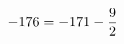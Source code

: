 \documentclass[preview]{standalone}
\begin{document}
\begin{align*}
\special{dvisvgm:raw <g id='unique000'>}-176 = -171 - \frac{9}{2}\special{dvisvgm:raw </g>}
\end{align*}
\end{document}
